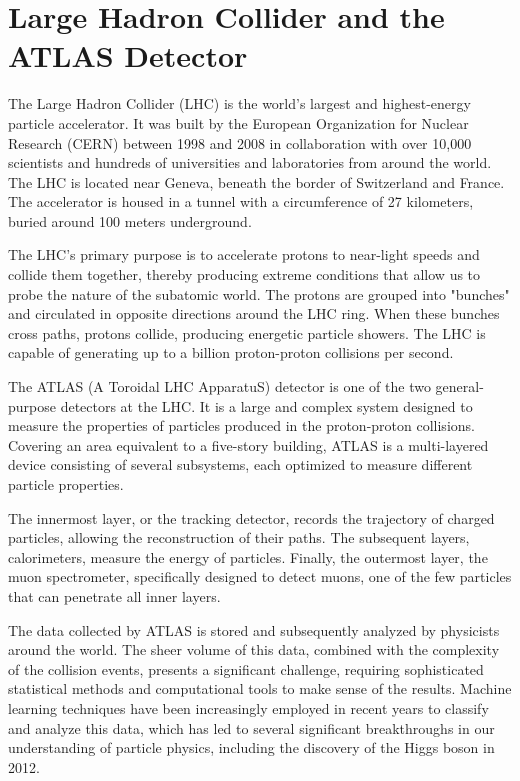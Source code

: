 \section{Large Hadron Collider and the ATLAS Detector}

The Large Hadron Collider (LHC) is the world's largest and highest-energy particle accelerator. It was built by the
European Organization for Nuclear Research (CERN) between 1998 and 2008 in collaboration with over 10,000 scientists and
hundreds of universities and laboratories from around the world. The LHC is located near Geneva, beneath the border of
Switzerland and France. The accelerator is housed in a tunnel with a circumference of 27 kilometers, buried around 100
meters underground.

The LHC's primary purpose is to accelerate protons to near-light speeds and collide them together, thereby producing
extreme conditions that allow us to probe the nature of the subatomic world. The protons are grouped into "bunches" and
circulated in opposite directions around the LHC ring. When these bunches cross paths, protons collide, producing
energetic particle showers. The LHC is capable of generating up to a billion proton-proton collisions per second.

The ATLAS (A Toroidal LHC ApparatuS) detector is one of the two general-purpose detectors at the LHC. It is a large and
complex system designed to measure the properties of particles produced in the proton-proton collisions. Covering an
area equivalent to a five-story building, ATLAS is a multi-layered device consisting of several subsystems, each
optimized to measure different particle properties.

The innermost layer, or the tracking detector, records the trajectory of charged particles, allowing the reconstruction
of their paths. The subsequent layers, calorimeters, measure the energy of particles. Finally, the outermost layer, the
muon spectrometer, specifically designed to detect muons, one of the few particles that can penetrate all inner layers.

The data collected by ATLAS is stored and subsequently analyzed by physicists around the world. The sheer volume of this
data, combined with the complexity of the collision events, presents a significant challenge, requiring sophisticated
statistical methods and computational tools to make sense of the results. Machine learning techniques have been
increasingly employed in recent years to classify and analyze this data, which has led to several significant
breakthroughs in our understanding of particle physics, including the discovery of the Higgs boson in 2012.

